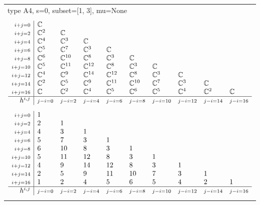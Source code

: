 \documentclass[crop,border=2mm]{standalone}
\begin{document}
\begin{tabular}{l}
{\huge type A4, s=0, subset=[1, 3], mu=None}\\ \\


$\displaystyle
\begin{array}{r|l l l l l l l l l}
	{\scriptstyle i+j=0}&\mathbb{C}&&&&&&&&\\
	{\scriptstyle i+j=2}&\mathbb{C}^{2}&\mathbb{C}&&&&&&&\\
	{\scriptstyle i+j=4}&\mathbb{C}^{4}&\mathbb{C}^{3}&\mathbb{C}&&&&&&\\
	{\scriptstyle i+j=6}&\mathbb{C}^{5}&\mathbb{C}^{7}&\mathbb{C}^{3}&\mathbb{C}&&&&&\\
	{\scriptstyle i+j=8}&\mathbb{C}^{6}&\mathbb{C}^{10}&\mathbb{C}^{8}&\mathbb{C}^{3}&\mathbb{C}&&&&\\
	{\scriptstyle i+j=10}&\mathbb{C}^{5}&\mathbb{C}^{11}&\mathbb{C}^{12}&\mathbb{C}^{8}&\mathbb{C}^{3}&\mathbb{C}&&&\\
	{\scriptstyle i+j=12}&\mathbb{C}^{4}&\mathbb{C}^{9}&\mathbb{C}^{14}&\mathbb{C}^{12}&\mathbb{C}^{8}&\mathbb{C}^{3}&\mathbb{C}&&\\
	{\scriptstyle i+j=14}&\mathbb{C}^{2}&\mathbb{C}^{5}&\mathbb{C}^{9}&\mathbb{C}^{11}&\mathbb{C}^{10}&\mathbb{C}^{7}&\mathbb{C}^{3}&\mathbb{C}&\\
	{\scriptstyle i+j=16}&\mathbb{C}&\mathbb{C}^{2}&\mathbb{C}^{4}&\mathbb{C}^{5}&\mathbb{C}^{6}&\mathbb{C}^{5}&\mathbb{C}^{4}&\mathbb{C}^{2}&\mathbb{C}\\
	\hline h^{i,j}&{\scriptstyle j-i=0}&{\scriptstyle j-i=2}&{\scriptstyle j-i=4}&{\scriptstyle j-i=6}&{\scriptstyle j-i=8}&{\scriptstyle j-i=10}&{\scriptstyle j-i=12}&{\scriptstyle j-i=14}&{\scriptstyle j-i=16}
\end{array}
$ \\ \\


$\displaystyle
\begin{array}{r|l l l l l l l l l}
	{\scriptstyle i+j=0}&1&&&&&&&&\\
	{\scriptstyle i+j=2}&2&1&&&&&&&\\
	{\scriptstyle i+j=4}&4&3&1&&&&&&\\
	{\scriptstyle i+j=6}&5&7&3&1&&&&&\\
	{\scriptstyle i+j=8}&6&10&8&3&1&&&&\\
	{\scriptstyle i+j=10}&5&11&12&8&3&1&&&\\
	{\scriptstyle i+j=12}&4&9&14&12&8&3&1&&\\
	{\scriptstyle i+j=14}&2&5&9&11&10&7&3&1&\\
	{\scriptstyle i+j=16}&1&2&4&5&6&5&4&2&1\\
	\hline h^{i,j}&{\scriptstyle j-i=0}&{\scriptstyle j-i=2}&{\scriptstyle j-i=4}&{\scriptstyle j-i=6}&{\scriptstyle j-i=8}&{\scriptstyle j-i=10}&{\scriptstyle j-i=12}&{\scriptstyle j-i=14}&{\scriptstyle j-i=16}
\end{array}
$ \\ \\



\end{tabular}
\end{document}
